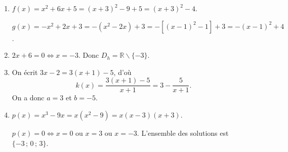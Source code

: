 \documentclass[11pt]{article}
\def\setminus{\mathbin{\backslash}}\let\smallsetminus\setminus
\begin{document}
\begin{corrige}
\begin{enumerate}
\item $f(x)=x^2+6x+5=(x+3)^2-9+5=(x+3)^2-4$.\par
$g(x)=-x^2+2x+3=-\left(x^2-2x\right)+3=-\left[(x-1)^2-1\right]+3=-(x-1)^2+4$.
\item $2x+6=0\iff x=-3$. Donc $D_h=\mathbb{R}\setminus\{-3\}$.
\item On écrit $3x-2=3(x+1)-5$, d'où
\[k(x)=\dfrac{3(x+1)-5}{x+1}=3-\dfrac{5}{x+1}.\]
On a donc $a=3$ et $b=-5$.
\item $p(x)=x^3-9x=x(x^2-9)=x(x-3)(x+3)$.\par
$p(x)=0\iff x=0$ ou $x=3$ ou $x=-3$. L'ensemble des solutions est $\{-3\,;\,0\,;\,3\}$.
\end{enumerate}
\end{corrige}
\end{document}
